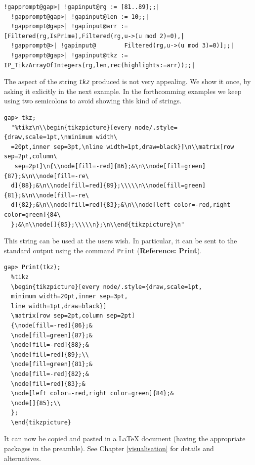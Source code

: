 \documentclass[a4paper,11pt]{report}
\begin{document}
{{ 
\begin{Verbatim}[commandchars=!@|,fontsize=\small,frame=single,label=Example]
  !gapprompt@gap>| !gapinput@rg := [81..89];;|
  !gapprompt@gap>| !gapinput@len := 10;;|
  !gapprompt@gap>| !gapinput@arr := [Filtered(rg,IsPrime),Filtered(rg,u->(u mod 2)=0),|
  !gapprompt@>| !gapinput@        Filtered(rg,u->(u mod 3)=0)];;|
  !gapprompt@gap>| !gapinput@tkz := IP_TikzArrayOfIntegers(rg,len,rec(highlights:=arr));;|
\end{Verbatim}
 The aspect of the string \mbox{\texttt{\mdseries\slshape tkz}} produced is not very appealing. We show it once, by asking it exlicitly in the
next example. In the forthcomming examples we keep using two semicolons to
avoid showing this kind of strings. 

 
\begin{Verbatim}[fontsize=\small,frame=single,label=The tkz string]
  gap> tkz;
  "%tikz\n\\begin{tikzpicture}[every node/.style={draw,scale=1pt,\nminimum width\
  =20pt,inner sep=3pt,\nline width=1pt,draw=black}]\n\\matrix[row sep=2pt,column\
   sep=2pt]\n{\\node[fill=-red]{86};&\n\\node[fill=green]{87};&\n\\node[fill=-re\
  d]{88};&\n\\node[fill=red]{89};\\\\\n\\node[fill=green]{81};&\n\\node[fill=-re\
  d]{82};&\n\\node[fill=red]{83};&\n\\node[left color=-red,right color=green]{84\
  };&\n\\node[]{85};\\\\\n};\n\\end{tikzpicture}\n"
\end{Verbatim}
 This string can be used at the users wish. In particular, it can be sent to
the standard output using the command \texttt{Print} (\textbf{Reference: Print}). 
\begin{Verbatim}[fontsize=\small,frame=single,label=The tikz code]
  gap> Print(tkz);
  %tikz
  \begin{tikzpicture}[every node/.style={draw,scale=1pt,
  minimum width=20pt,inner sep=3pt,
  line width=1pt,draw=black}]
  \matrix[row sep=2pt,column sep=2pt]
  {\node[fill=-red]{86};&
  \node[fill=green]{87};&
  \node[fill=-red]{88};&
  \node[fill=red]{89};\\
  \node[fill=green]{81};&
  \node[fill=-red]{82};&
  \node[fill=red]{83};&
  \node[left color=-red,right color=green]{84};&
  \node[]{85};\\
  };
  \end{tikzpicture}
\end{Verbatim}
 It can now be copied and pasted in a {\LaTeX} document (having the appropriate packages in the preamble). See Chapter \ref{visualisation} for details and alternatives. 

}}
\end{document}
